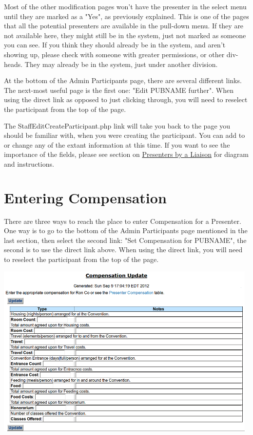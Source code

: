 \documentclass[captions=tablesignature]{scrartcl}
\begin{document}
Most of the other modification pages won't have the presenter in the
select menu until they are marked as a "Yes", as previously
explained.  This is one of the pages that all the potential
presenters are available in the pull-down menu.  If they are not
available here, they might still be in the system, just not marked
as someone you can see.  If you think they should already be in the
system, and aren't showing up, please check with someone with
greater permissions, or other div-heads.  They may already be in the
system, just under another division.

At the bottom of the Admin Participants page, there are several
different links.  The next-most useful page is the first one: "Edit
PUBNAME further". When using the direct link as opposed to just
clicking through, you will need to reselect the participant from the
top of the page.

The StaffEditCreateParticipant.php link will take you back to the
page you should be familiar with, when you were creating the
participant.  You can add to or change any of the extant information
at this time.  If you want to see the importance of the fields,
please see section on \hyperref[sec-2-3]{Presenters by a Liaison} for diagram and
instructions.
\section{Entering Compensation}
\label{sec-4}
There are three ways to reach the place to enter Compensation for a
Presenter.  One way is to go to the bottom of the Admin Participants
page mentioned in the last section, then select the second link:
"Set Compensation for PUBNAME", the second is to use the direct link
above.  When using the direct link, you will need to reselect the
participant from the top of the page.

\includegraphics[width=0.98\textwidth]{./Images/Compensation_Update.png}
\end{document}
